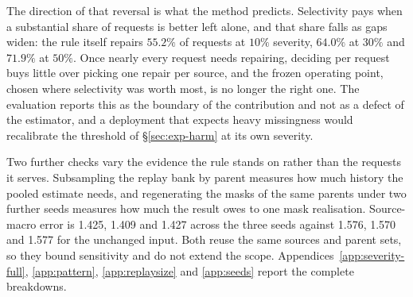 \documentclass{article}
\begin{document}
The direction of that reversal is what the method predicts. Selectivity pays when a
substantial share of requests is better left alone, and that share falls as gaps widen: the
rule itself repairs $55.2\%$ of requests at $10\%$ severity, $64.0\%$ at $30\%$ and $71.9\%$
at $50\%$. Once nearly every request needs repairing, deciding per request buys little over
picking one repair per source, and the frozen operating point, chosen where selectivity was
worth most, is no longer the right one. The evaluation reports this as the boundary of the
contribution and not as a defect of the estimator, and a deployment that expects heavy
missingness would recalibrate the threshold of \S\ref{sec:exp-harm} at its own severity.

Two further checks vary the evidence the rule stands on rather than the requests it serves.
Subsampling the replay bank by parent measures how much history the pooled estimate needs, and
regenerating the masks of the same parents under two further seeds measures how much the
result owes to one mask realisation. Source-macro error is 1.425, 1.409 and 1.427 across
the three seeds against 1.576, 1.570 and 1.577 for the unchanged input.
Both reuse the same sources and parent sets, so they bound sensitivity and do not extend the
scope. Appendices~\ref{app:severity-full}, \ref{app:pattern}, \ref{app:replaysize} and
\ref{app:seeds} report the complete breakdowns.
\end{document}
